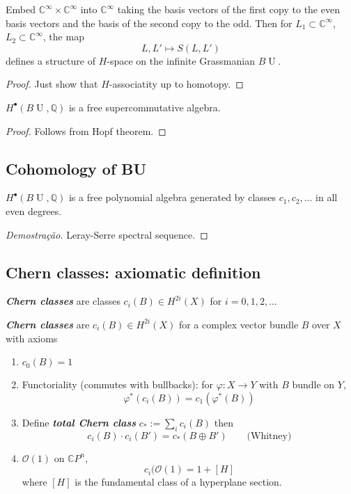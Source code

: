 \begin{prop}
	Embed $\mathbb{C}^{\infty}\times \mathbb{C}^\infty$ into $\mathbb{C}^\infty$ taking the basis vectors of the first copy to the even basis vectors and the basis of the second copy to the odd. Then for $L_1\subset \mathbb{C}^\infty$, $L_2\subset \mathbb{C}^\infty$, the map
	\[L,L'\mapsto S(L,L')\]
	defines a structure of $H$-space on the infinite Grassmanian $B\operatorname{U}$.
\end{prop}

\begin{proof}
	Just show that $H$-associatity up to homotopy.
\end{proof}

\begin{coro}
	$H^\bullet(B\operatorname{U},\mathbb{Q})$ is a free supercommutative algebra.
\end{coro}
\begin{proof}
	Follows from Hopf theorem.
\end{proof}

\subsection{Cohomology of BU}

\begin{claim}
	$H^\bullet(B\operatorname{U},\mathbb{Q})$ is a free polynomial algebra generated by classes $c_1,c_2,\ldots$ in all even degrees.
\end{claim}

\begin{proof}[Demostra\c c\~ao]
	Leray-Serre spectral sequence.
\end{proof}

\subsection{Chern classes: axiomatic definition}

\begin{defn}
	\textit{\textbf{Chern classes}} are classes  $c_i(B)\in H^{2i}(X)$ for $i=0,1,2,\ldots$

	\textit{\textbf{Chern classes}} are  $c_i(B)\in H^{2i}(X)$ for a complex vector bundle $B$ over $X$ with axioms

	\begin{enumerate}[label=\alph*.]
		\item $c_0(B)=1$

		\item Functoriality (commutes with bullbacks): for $\varphi:X\to Y$ with $B$ bundle on $Y$, 
			 \[\varphi^*(c_i(B))=c_1(\varphi^*(B))\]

		\item Define \textit{\textbf{total Chern class}}  $c_{*}:=\sum_{i}c_i(B)$ then
			\[c_i(B)\cdot c_i(B')=c_*(B\oplus B')\qquad \text{(Whitney)} \]

		\item $\mathcal{O}(1)$ on $\mathbb{C}P^{n}$,
			\[c_i(\mathcal{O}(1)=1+[H]\]
			where $[H]$ is the fundamental class of a hyperplane section.
	\end{enumerate}
\end{defn}

